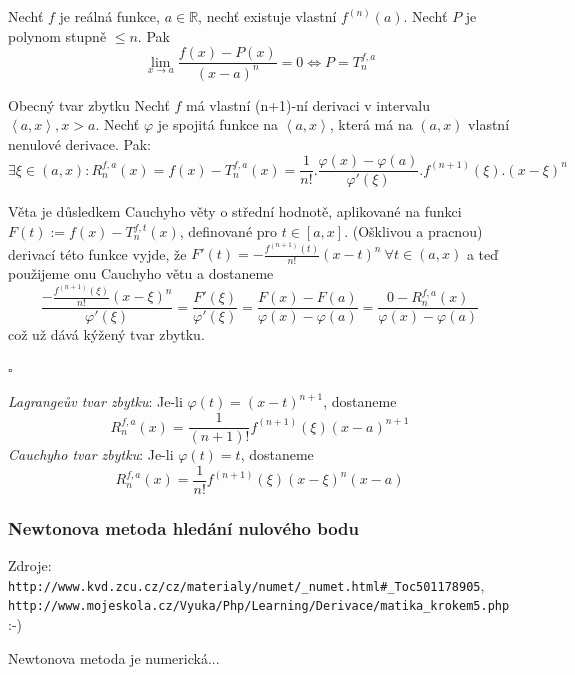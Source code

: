 \begin{veta}
Nechť $f$ je reálná funkce, $a \in \mathbb{R}$, nechť existuje vlastní $f^{(n)}(a)$. Nechť $P$ je polynom stupně $\le n$. Pak $$\lim_{x \rightarrow a} \frac{f(x)-P(x)}{(x-a)^n}=0 \Leftrightarrow P=T^{f,a}_{n}$$
\end{veta}

\begin{vetaN}{Obecný tvar zbytku}
Nechť $f$ má vlastní (n+1)-ní derivaci v intervalu $\left<a,x\right>, x>a$. Nechť $\varphi$ je spojitá funkce na $\left<a,x\right>$, která má na $(a,x)$ vlastní nenulové derivace. Pak:
$$\exists \xi \in (a, x): R^{f,a}_{n}(x)=f(x)-T^{f,a}_n(x)=\frac{1}{n!}.\frac{\varphi(x)-\varphi(a)}{\varphi'(\xi)}.f^{(n+1)}(\xi).(x-\xi)^n$$

\begin{dukaz}
Věta je důsledkem Cauchyho věty o střední hodnotě, aplikované na funkci $F(t):=f(x)-T^{f,t}_n(x)$, definované pro $t\in[a,x]$. (Ošklivou a pracnou) derivací této funkce vyjde, že $F'(t) = -\frac{f^{(n+1)}(t)}{n!}(x-t)^n\ \forall t\in(a,x)$ a teď použijeme onu Cauchyho větu a dostaneme 
$$\frac{-\frac{f^{(n+1)}(\xi)}{n!}(x-\xi)^n}{\varphi'(\xi)} = \frac{F'(\xi)}{\varphi'(\xi)} = \frac{F(x)-F(a)}{\varphi(x)-\varphi(a)} = \frac{0-R_n^{f,a}(x)}{\varphi(x)-\varphi(a)}$$
což už dává kýžený tvar zbytku.
\begin{flushright}$\square$\end{flushright}
\end{dukaz}
\end{vetaN}

\begin{dusledek}
\emph{Lagrangeův tvar zbytku}:
Je-li $\varphi(t)=(x-t)^{n+1}$, dostaneme
$$R^{f,a}_{n}(x)=\frac{1}{(n+1)!} f^{(n+1)}(\xi) (x-a)^{n+1}$$
\emph{Cauchyho tvar zbytku}:
Je-li $\varphi(t)=t$, dostaneme
$$R^{f,a}_{n}(x)=\frac{1}{n!} f^{(n+1)}(\xi) (x-\xi)^{n} (x-a)$$
\end {dusledek}

\subsubsection*{Newtonova metoda hledání nulového bodu}
Zdroje: \\
\texttt{http://www.kvd.zcu.cz/cz/materialy/numet/\_numet.html\#\_Toc501178905},\\ 
\texttt{http://www.mojeskola.cz/Vyuka/Php/Learning/Derivace/matika\_krokem5.php} :-)

\medskip
Newtonova metoda je numerická...

